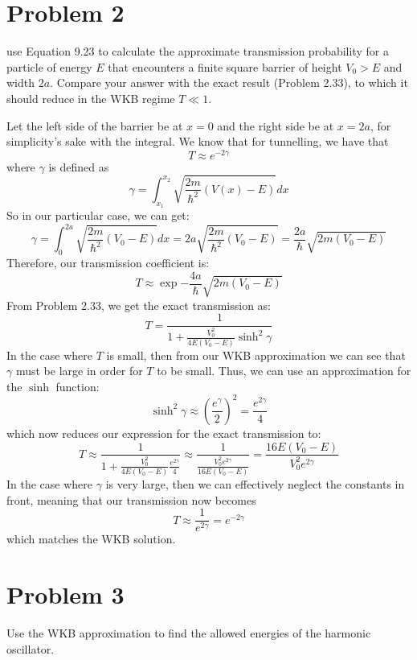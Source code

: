\documentclass[10pt]{article}
\begin{document}
	\section*{Problem 2}
	use Equation 9.23 to calculate the approximate transmission probability for a particle of energy $E$ that 
	encounters a finite square barrier of height $V_0 > E$ and width $2a$. Compare your answer with the exact 
	result (Problem 2.33), to which it should reduce in the WKB regime $T \ll 1$. 


	\begin{solution}
		Let the left side of the barrier be at $x = 0$ and the right side be at $x = 2a$, for simplicity's
		sake with the integral. We know that for tunnelling, we have that 
		\[
			T \approx e^{-2\gamma}
		\] 
		where $\gamma$ is defined as
		\[
		\gamma = \int_{x_1}^{x_2} \sqrt{\frac{2m}{\hbar^2}(V(x) - E)} dx
		\] 
		So in our particular case, we can get:
		\[
			\gamma = \int_0^{2a} \sqrt{\frac{2m}{\hbar^2}(V_0 - E)} dx = 2a \sqrt{\frac{2m}{\hbar^2}(V_0 - E)} = 
			\frac{2a}{\hbar}\sqrt{2m(V_0 - E)} 
		\] 
		Therefore, our transmission coefficient is:
		\[
			T \approx \exp{-\frac{4a}{\hbar}\sqrt{2m (V_0 - E)} }
		\] 
		From Problem 2.33, we get the exact transmission as:
		\[
		 T = \frac{1}{1 + \frac{V_0^2}{4E(V_0 - E)}\sinh^2 \gamma}
		\] 
		In the case where $T$ is small, then from our WKB approximation we can see that $\gamma$ must be large
		in order for $T$ to be small. Thus, we can use an approximation for the $\sinh$ function:
		\[
			\sinh^2 \gamma \approx \left( \frac{e^\gamma}{2}\right)^2 = \frac{e^{2\gamma}}{4}
		\] 
		which now reduces our expression for the exact transmission to:
		\[
			T \approx \frac{1}{1 + \frac{V_0^2}{4E(V_0 - E)} \frac{e^{2\gamma}}{4}} \approx \frac{1}{\frac{V_0^2e^{2\gamma}}{16E(V_0 - E)}} = \frac{16 E(V_0 - E)}{V_0^2 e^{2\gamma}}
		\] 
		In the case where $\gamma$ is very large, then we can effectively neglect the constants in front, 
		meaning that our transmission now becomes
		\[
			T \approx \frac{1}{e^{2\gamma}} = e^{-2\gamma} 
		\] 
		which matches the WKB solution.
	\end{solution}
	\pagebreak

	\section*{Problem 3}

	Use the WKB approximation to find the allowed energies of the harmonic oscillator. 
\end{document}
